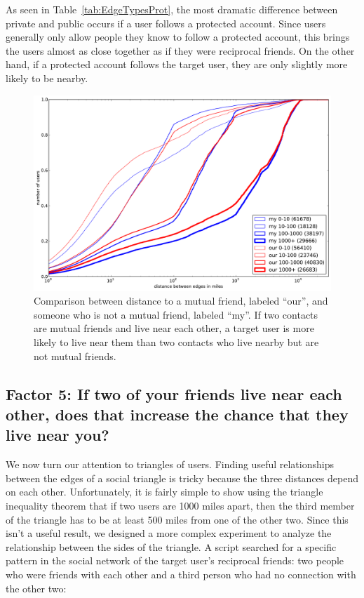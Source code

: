 \documentclass[letterpaper]{article}
\begin{document}
As seen in Table~\ref{tab:EdgeTypesProt}, the most dramatic difference between
private and public occurs if a user follows a protected account.
%
Since users generally only allow people they know to follow a protected
account, this brings the users almost as close together as if they were
reciprocal friends.
%
On the other hand, if a protected account follows the target user, they
are only slightly more likely to be nearby.

\begin{figure}[tb]
\centering
\includegraphics[width=.9\linewidth]{figures/near_triads.pdf}
\caption{
Comparison between distance to a mutual friend, labeled ``our'', and someone
who is not a mutual friend, labeled ``my''.
If two contacts are mutual friends and live near each other, a target user is
more likely to live near them than two contacts who live nearby but are not
mutual friends.
}
\label{fig:NearTriads}
\end{figure}

\subsection{Factor 5: If two of your friends live near each other, does that increase the
chance that they live near you?}

We now turn our attention to triangles of users.
Finding useful relationships between the edges of a social triangle is tricky
because the three distances depend on each other.
Unfortunately, it is fairly simple to show using the triangle inequality theorem
that if two users are 1000 miles apart, then the third member of the triangle
has to be at least 500 miles from one of the other two.
Since this isn't a useful result, we designed a more complex experiment to
analyze the relationship between the sides of the triangle.
A script searched for a specific pattern in the social network of
the target user's reciprocal friends: two people who were friends with each
other and a third person who had no connection with the other two:
\end{document}
